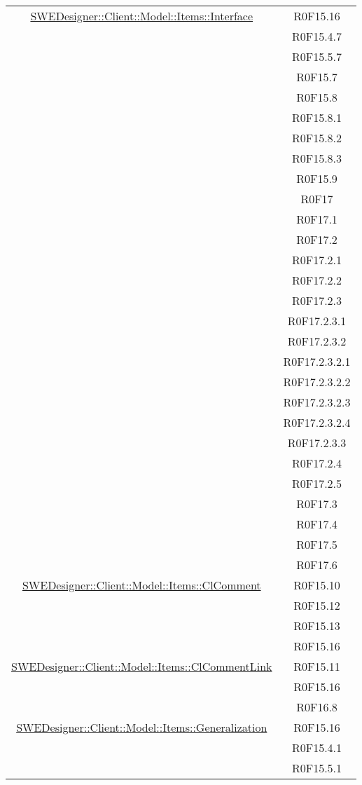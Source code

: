 \documentclass[../DefinizioneDiProdotto.tex]{subfiles}
\begin{document}
\begin{longtable}{|c|c|}
				\hyperlink{SWEDesigner::Client::Model::Items::Interface}{SWEDesigner::Client::Model::Items::Interface}
				& R0F15.16\\
				& R0F15.4.7\\
				& R0F15.5.7\\
				& R0F15.7\\
				& R0F15.8\\
				& R0F15.8.1\\
				& R0F15.8.2\\
				& R0F15.8.3\\
				& R0F15.9\\
				& R0F17\\
				& R0F17.1\\
				& R0F17.2\\
				& R0F17.2.1\\
				& R0F17.2.2\\
				& R0F17.2.3\\
				& R0F17.2.3.1\\
				& R0F17.2.3.2\\
				& R0F17.2.3.2.1\\
				& R0F17.2.3.2.2\\
				& R0F17.2.3.2.3\\
				& R0F17.2.3.2.4\\
				& R0F17.2.3.3\\
				& R0F17.2.4\\
				& R0F17.2.5\\
				& R0F17.3\\
				& R0F17.4\\
				& R0F17.5\\
				& R0F17.6\\
				\hline

				\hyperlink{SWEDesigner::Client::Model::Items::ClComment}{SWEDesigner::Client::Model::Items::ClComment}
				& R0F15.10\\
				& R0F15.12\\
				& R0F15.13\\
				& R0F15.16\\
				\hline

				\hyperlink{SWEDesigner::Client::Model::Items::ClCommentLink}{SWEDesigner::Client::Model::Items::ClCommentLink}
				& R0F15.11\\
				& R0F15.16\\
				& R0F16.8\\
				\hline

				\hyperlink{SWEDesigner::Client::Model::Items::Generalization}{SWEDesigner::Client::Model::Items::Generalization}
				& R0F15.16\\
				& R0F15.4.1\\
				& R0F15.5.1\\
				\hline


\end{longtable}
\end{document}

